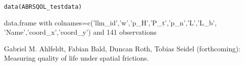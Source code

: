 \documentclass[a4paper]{book}
\begin{document}
%
\begin{Usage}
\begin{verbatim}
data(ABRSQOL_testdata)
\end{verbatim}
\end{Usage}
%
\begin{Format}
data.frame with colnames=c('llm\_id','w','p\_H','P\_t','p\_n','L','L\_b',
'Name','coord\_x','coord\_y') and 141 observations
\end{Format}
%
\begin{Source}
\end{Source}
%
\begin{References}
Gabriel M. Ahlfeldt, Fabian Bald, Duncan Roth, Tobias Seidel
(forthcoming): Measuring quality of life under spatial frictions.
\end{References}
%
\begin{Examples}
\end{Examples}
\printindex{}
\end{document}

